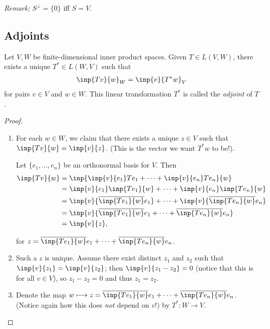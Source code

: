 \emph{Remark;} $S^\perp=\{0\}$ iff $S=V$.



\subsection{Adjoints}

\begin{theorem}
  Let $V,W$ be finite-dimensional inner product spaces. Given $T\in L(V,W)$, there exists a unique $T^*\in L(W,V)$ such that
  \begin{align*}
    \inp{Tv}{w}_W = \inp{v}{T^*w}_V
  \end{align*}
  for pairs $v\in V$ and $w\in W$. This linear transformation $T^*$ is called the \emph{adjoint} of $T$.
\end{theorem}
\begin{proof}
  \begin{enumerate}[{Step} 1)]
    \item For each $w\in W$, we claim that there exists a unique $z\in V$ such that $\inp{Tv}{w}=\inp{v}{z}$. (This is the vector we want $T^*w$ to be!).

    Let $\{e_1,\dots,e_n\}$ be an orthonormal basis for $V$. Then
    \begin{align*}
      \inp{Tv}{w} &= \inp{\inp{v}{e_1}Te_1 + \cdots + \inp{v}{e_n}Te_n}{w}\\
      &= \inp{v}{e_1}\inp{Te_1}{w} + \cdots + \inp{v}{e_n}\inp{Te_n}{w}\\
      &= \inp{v}{\overline{\inp{Te_1}{w}}e_1} + \cdots + \inp{v}{\overline{\inp{Te_n}{w}}e_n}\\
      &= \inp{v}{\overline{\inp{Te_1}{w}}e_1 + \cdots + \overline{\inp{Te_n}{w}}e_n}\\
      &= \inp{v}{z},
    \end{align*}

    for $z=\overline{\inp{Te_1}{w}}e_1 + \cdots + \overline{\inp{Te_n}{w}}e_n$.

    \item Such a $z$ is unique. Assume there exist distinct $z_1$ and $z_2$ such that $\inp{v}{z_1}=\inp{v}{z_2}$; then $\inp{v}{z_1-z_2}=0$ (notice that this is for all $v\in V$), so $z_1-z_2=0$ and thus $z_1=z_2$.

    \item Denote the map $w \longmapsto z=\overline{\inp{Te_1}{w}}e_1 + \cdots + \overline{\inp{Te_n}{w}}e_n$. (Notice again how this does \emph{not} depend on $v$!) by $T^*:W\to V$.


\end{enumerate}
\end{proof}

